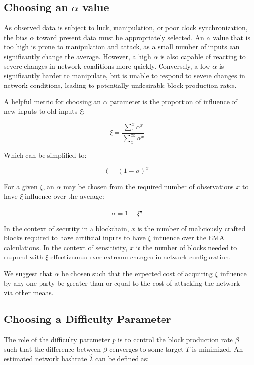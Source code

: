 \documentclass[]{article}
\begin{document}
\subsection{Choosing an $\alpha$ value}

As observed data is subject to luck, manipulation, or poor clock synchronization, the bias $\alpha$ toward present data must be appropriately selected.  An $\alpha$ value that is too high is prone to manipulation and attack, as a small number of inputs can significantly change the average.  However, a high $\alpha$ is also capable of reacting to severe changes in network conditions more quickly.  Conversely, a low $\alpha$ is significantly harder to manipulate, but is unable to respond to severe changes in network conditions, leading to potentially undesirable block production rates.
\newline 

 A helpful metric for choosing an $\alpha$ parameter is the proportion of influence of new inputs to old inputs $\xi$:

\begin{equation}
\xi = \frac{\sum_{1}^{x} \alpha^x}{\sum_{x}^{\infty} \alpha^x}
\end{equation}

Which can be simplified to: 

\begin{equation}
	\xi = (1 - \alpha)^x
\end{equation}

For a given $\xi$, an $\alpha$ may be chosen from the required number of observations $x$ to have $\xi$ influence over the average: 

\begin{equation}
\alpha = 1 - \xi^\frac{1}{x}
\end{equation}

In the context of security in a blockchain, $x$ is the number of maliciously crafted blocks required to have artificial inputs to have $\xi$ influence over the EMA calculations.  In the context of sensitivity, $x$ is the number of blocks needed to respond with $\xi$ effectiveness over extreme changes in network configuration.  
\newline

We suggest that $\alpha$ be chosen such that the expected cost of acquiring $\xi$ influence by any one party be greater than or equal to the cost of attacking the network via other means.  

\subsection{Choosing a Difficulty Parameter}
The role of the difficulty parameter $p$ is to control the block production rate $\beta$ such that the difference between $\beta$ converges to some target $T$ is minimized.  An estimated network hashrate $\hat{\lambda}$ can be defined as: 
\end{document}
